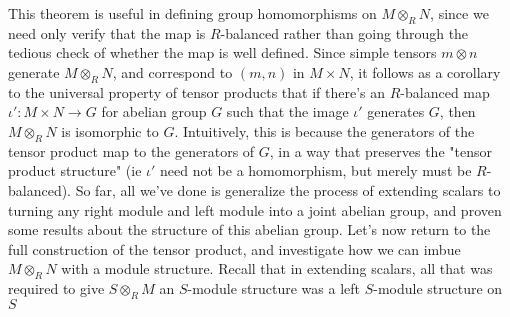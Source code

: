 \documentclass{article}
\begin{document}
\nn
This theorem is useful in defining group homomorphisms on $ M \otimes_R N $, since we need only verify that the map is $ R $-balanced rather than going through the tedious check of whether the map is well defined. Since simple tensors $ m \otimes n $ generate $ M \otimes_R N $, and correspond to $ (m, n) $ in $ M \times N $, it follows as a corollary to the universal property of tensor products that if there's an $ R $-balanced map $ \iota': M \times N \rightarrow G $ for abelian group $ G $ such that the image $ \iota' $ generates $ G $, then $ M \otimes_R N $ is isomorphic to $ G $. Intuitively, this is because the generators of the tensor product map to the generators of $ G $, in a way that preserves the "tensor product structure" (ie $ \iota' $ need not be a homomorphism, but merely must be $ R $-balanced).
\nn
So far, all we've done is generalize the process of extending scalars to turning any right module and left module into a joint abelian group, and proven some results about the structure of this abelian group. Let's now return to the full construction of the tensor product, and investigate how we can imbue $ M \otimes_R N $ with a module structure. Recall that in extending scalars, all that was required to give $ S \otimes_R M $ an $ S $-module structure was a left $ S $-module structure on $ S $
\end{document}
